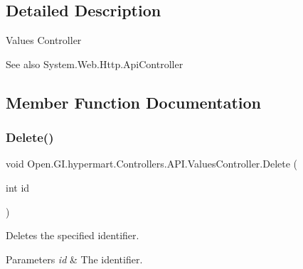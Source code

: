\subsection{Detailed Description}


Values Controller 

\begin{DoxySeeAlso}{See also}
System.\+Web.\+Http.\+Api\+Controller


\end{DoxySeeAlso}


\subsection{Member Function Documentation}
\hypertarget{class_open_1_1_g_i_1_1hypermart_1_1_controllers_1_1_a_p_i_1_1_values_controller_aac5ef946899bcf7c07bdf860004f8c1a}{}\label{class_open_1_1_g_i_1_1hypermart_1_1_controllers_1_1_a_p_i_1_1_values_controller_aac5ef946899bcf7c07bdf860004f8c1a} 
\subsubsection{\texorpdfstring{Delete()}{Delete()}}
{\footnotesize\ttfamily void Open.\+G\+I.\+hypermart.\+Controllers.\+A\+P\+I.\+Values\+Controller.\+Delete (\begin{DoxyParamCaption}\item[{int}]{id }\end{DoxyParamCaption})}



Deletes the specified identifier. 


\begin{DoxyParams}{Parameters}
{\em id} & The identifier.\\
\hline
\end{DoxyParams}
\hypertarget{class_open_1_1_g_i_1_1hypermart_1_1_controllers_1_1_a_p_i_1_1_values_controller_a22701a876d9570628f81c46396db9470}{}\label{class_open_1_1_g_i_1_1hypermart_1_1_controllers_1_1_a_p_i_1_1_values_controller_a22701a876d9570628f81c46396db9470} 

